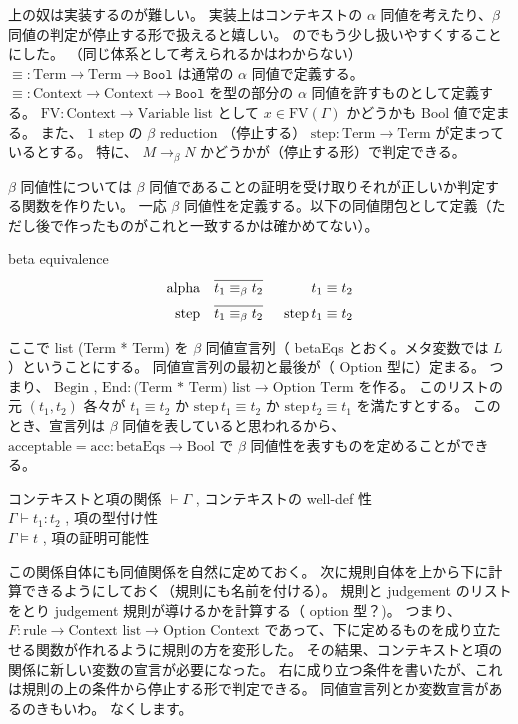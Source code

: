 上の奴は実装するのが難しい。
実装上はコンテキストの \(\alpha\) 同値を考えたり、\(\beta\) 同値の判定が停止する形で扱えると嬉しい。
のでもう少し扱いやすくすることにした。
（同じ体系として考えられるかはわからない）
\(\equiv: \text{Term} \to \text{Term} \to \texttt{Bool}\)
は通常の \(\alpha\) 同値で定義する。
\(\equiv : \text{Context} \to \text{Context} \to \texttt{Bool}\)
を型の部分の \(\alpha\) 同値を許すものとして定義する。
\(\text{FV} : \text{Context} \to \text{Variable list}\)
として \(x \in \text{FV}(\Gamma)\) かどうかも Bool 値で定まる。
また、 \(1\) step の \(\beta\) reduction （停止する）
\(\text{step} : \text{Term} \to \text{Term}\)
が定まっているとする。
特に、 \(M \rightarrow_{\beta} N\) かどうかが（停止する形）で判定できる。

\(\beta\) 同値性については \(\beta\) 同値であることの証明を受け取りそれが正しいか判定する関数を作りたい。
一応 \(\beta\) 同値性を定義する。以下の同値閉包として定義（ただし後で作ったものがこれと一致するかは確かめてない）。
\begin{itembox}[l]{beta equivalence}
\begin{align*}
  \text{alpha} &&
  \infer[]{t_1 \equiv_{\beta} t_2}{} && t_1 \equiv t_2 \\
  \text{step} &&
  \infer[]{t_1 \equiv_{\beta} t_2}{} && \text{step} \, t_1 \equiv t_2 \\
\end{align*}
\end{itembox}

ここで list (Term * Term) を \(\beta\) 同値宣言列（ betaEqs とおく。メタ変数では \(L\) ）ということにする。
同値宣言列の最初と最後が（ Option 型に）定まる。
つまり、 \(\text{Begin , End} : \text{(Term * Term) list} \to \text{Option Term}\) を作る。
このリストの元 \((t_1 , t_2)\) 各々が \(t_1 \equiv t_2\) か \(\text{step} \, t_1 \equiv t_2\) か \(\text{step} \, t_2 \equiv t_1\) を満たすとする。
このとき、宣言列は \(\beta\) 同値を表していると思われるから、\(\text{acceptable} = \text{acc} : \text{betaEqs} \to \text{Bool}\) で \(\beta\) 同値性を表すものを定めることができる。

\begin{itembox}[l]{コンテキストと項の関係}
  \(\vdash \Gamma\) , コンテキストの well-def 性 \\
  \(\Gamma \vdash t_1 : t_2\) , 項の型付け性 \\
  \(\Gamma \vDash t\) , 項の証明可能性
\end{itembox}

この関係自体にも同値関係を自然に定めておく。
次に規則自体を上から下に計算できるようにしておく（規則にも名前を付ける）。
規則と judgement のリストをとり judgement 規則が導けるかを計算する（ option 型？)。
つまり、 \(F : \text{rule} \to \text{Context list} \to \text{Option Context}\) であって、下に定めるものを成り立たせる関数が作れるように規則の方を変形した。
その結果、コンテキストと項の関係に新しい変数の宣言が必要になった。
右に成り立つ条件を書いたが、これは規則の上の条件から停止する形で判定できる。
同値宣言列とか変数宣言があるのきもいわ。
なくします。

